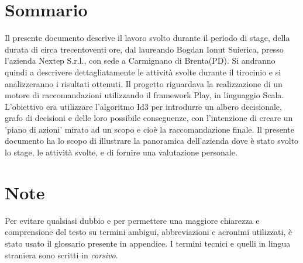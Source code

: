 
\cleardoublepage
{}
{}
\begingroup
\let\clearpage\relax
\let\cleardoublepage\relax
\let\cleardoublepage\relax

\chapter*{Sommario}

Il presente documento descrive il lavoro svolto durante il periodo di stage, della durata di circa trecentoventi ore, dal laureando Bogdan Ionut Suierica, presso l'azienda Nextep S.r.l., con sede a Carmignano di Brenta(PD). Si andranno quindi a descrivere dettagliatamente le attività svolte durante il tirocinio e si analizzeranno i risultati ottenuti. Il progetto riguardava la realizzazione di un motore di raccomandazioni utilizzando il framework Play, in linguaggio Scala. L'obiettivo era utilizzare l'algoritmo Id3 per introdurre un albero decisionale, grafo di decisioni e delle loro possibile conseguenze, con l'intenzione di creare un 'piano di azioni' mirato ad un scopo e cioè la raccomandazione finale.
Il presente documento ha lo scopo di illustrare la panoramica dell'azienda dove è stato svolto lo stage, le attività svolte, e di fornire una valutazione personale.

\chapter*{Note}
Per evitare qualsiasi dubbio e per permettere una maggiore chiarezza e comprensione del testo su termini ambigui, abbreviazioni e acronimi utilizzati, è stato usato il glossario presente in appendice. I termini tecnici e quelli in lingua straniera sono scritti in \textit{corsivo}.

%
%

\endgroup			

\vfill

